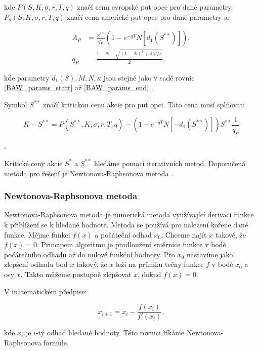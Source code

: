 \documentclass[male,czech,api_bc]{kitheses}
\begin{document}
  kde $P(S, K, \sigma, r, T, q)$ značí cenu evropské put opce pro dané parametry, $P_a(S, K, \sigma, r, T, q)$ značí cenu americké put opce pro dané parametry a:

  \begin{align}
    A_P &= \frac{S^{**}}{q_P} (1 - e^{-qT} N[d_1 (S^{**})]), \\
    q_P &= \frac{1 - N - \sqrt{(1 - N)^2 + 4M / \kappa}}{2},
  \end{align}

  kde parametry $d_1(S), M, N, \kappa$ jsou stejné jako v sadě rovnic \eqref{BAW_params_start} až \eqref{BAW_params_end} \parencites[kapitola~3.1]{Haug2007}.

  Symbol $S^{**}$ značí kritickou cenu akcie pro put opci. Tato cena musí splňovat:

  \begin{equation}
    K - S^{**} = P(S^{**}, K, \sigma, r, T, q) - (1 - e^{-qT}N[-d_1(S^{**})])S^{**} \frac{1}{q_P} \label{eq:s_ss_stock_price}
  \end{equation}

  \parencites[kapitola~3.1]{Haug2007}.

  Kritické ceny akcie $S^*$ a $S^{**}$ hledáme pomocí iterativních metod. Doporučená metoda pro řešení je Newtonova-Raphsonova metoda \parencites{BaroneAdesiWhaley1987}.

  \subsubsection{Newtonova-Raphsonova metoda}

  \label{sec:bs_nr}
  Newtonova-Raphsonova metoda je numerická metoda využívající derivaci funkce k přiblížení se k hledané hodnotě. Metoda se používá pro nalezení kořene dané funkce.
  Mějme funkci $f(x)$ a počáteční odhad $x_0$. Chceme najít $x$ takové, že $f(x) = 0$. Principem algoritmu je prodloužení směrnice funkce v bodě počátečního odhadu až do nulové funkční hodnoty. Pro $x_0$ nastavíme jako zlepšení odhadu bod $x$ takový, že $x$ leží na průniku tečny funkce $f$ v bodě $x_0$ a osy $x$. Takto můžeme postupně zlepšovat $x$, dokud $f(x) = 0$. \parencites[kapitola~9.4]{Press2007}

  V matematickém předpise:

  \begin{equation}
    \label{eq:iteration}
    x_{i+1} = x_i - \frac{f(x_i)}{f'(x_i)},
  \end{equation}

  kde $x_i$ je $i$-tý odhad hledané hodnoty. Této rovnici říkáme Newtonova-Raphsonova formule.
\end{document}

